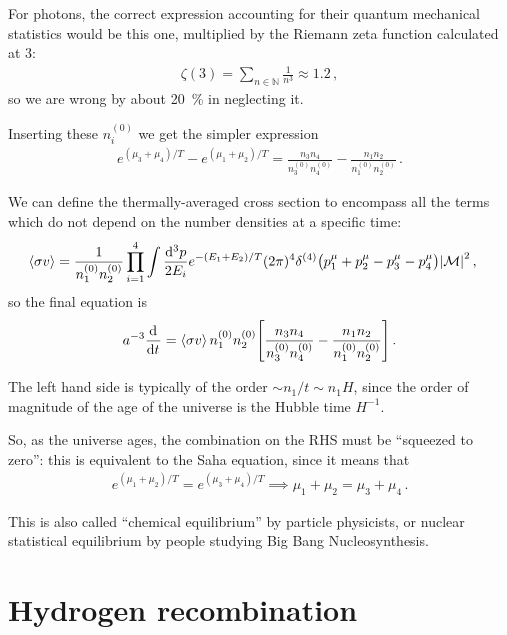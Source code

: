 \documentclass[main.tex]{subfiles}
\begin{document}
For photons, the correct expression accounting for their quantum mechanical statistics would be this one, multiplied by the Riemann zeta function calculated at \(3\): 
%
\begin{align}
\zeta (3) = \sum _{n \in \mathbb{N} } \frac{1}{n^3} \approx 1.2
\,,
\end{align}
%
so we are wrong by about \SI{20}{\percent} in neglecting it. 

Inserting these \(n_i^{(0)}\) we get the simpler expression
%
\begin{align}
e^{(\mu_3 + \mu_4 ) / T} - e^{( \mu_1 + \mu_2 ) / T} 
=
\frac{n_3 n_4 }{n_3^{(0)} n_4^{(0)}}
- 
\frac{n_1 n_2 }{n_1^{(0)} n_2^{(0)}}
\,.
\end{align}

We can define the thermally-averaged cross section to encompass all the terms which do not depend on the number densities at a specific time: 
%
\begin{align}
\expval{\sigma v} &= \frac{1}{n_1^{(0)} n_2^{(0)}}
\prod_{i=1}^{4} \int \frac{ \dd[3]{p}}{2 E_i} 
e^{- (E_1 + E_2 ) / T} 
(2 \pi )^{4} \delta^{(4)} \qty(p^{\mu }_{1} + p^{\mu }_{2} - p^{\mu }_{3} - p^{\mu }_{4}) \abs{\mathcal{M}}^2
\,,
\end{align}
%
so the final equation is 
%
\begin{align}
a^{-3} \dv[]{}{t} (n_1 a^3)
= \expval{\sigma v} n_1^{(0)} n_2^{(0)} \qty[
\frac{n_3 n_4 }{n_3^{(0)} n_4^{(0)}}
- 
\frac{n_1 n_2 }{n_1^{(0)} n_2^{(0)}}]
\,.
\end{align}

The left hand side is typically of the order \(\sim n_1 / t \sim n_1 H\), since the order of magnitude of the age of the universe is the Hubble time \(H^{-1}\).

So, as the universe ages, the combination on the RHS must be ``squeezed to zero'': this is equivalent to the Saha equation, since it means that 
%
\begin{align}
e^{(\mu_1 + \mu_2 ) / T} = e^{(\mu_3 + \mu_4 ) / T} \implies \mu_1 + \mu_2 = \mu_3 + \mu_4 
\,.
\end{align}

This is also called ``chemical equilibrium'' by particle physicists, or nuclear statistical equilibrium by people studying Big Bang Nucleosynthesis. 

\section{Hydrogen recombination}
\end{document}
